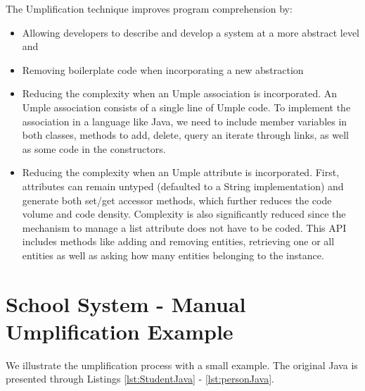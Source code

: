 The Umplification technique improves program comprehension by:
\begin{itemize}
\item Allowing developers to describe and develop a system at a more abstract level and

\item Removing boilerplate code when incorporating a new abstraction

\item Reducing the complexity when an Umple association is incorporated. An Umple association consists of a single line of Umple code. To implement the association in a language like Java, we need to include member variables in both classes, methods to add, delete, query an iterate through links, as well as some code in the constructors.

\item Reducing the complexity when an Umple attribute is incorporated. First, attributes can remain untyped (defaulted to a String implementation) and generate both set/get accessor methods, which further reduces the code volume and code density. Complexity is also significantly reduced since the mechanism to manage a list attribute does not have to be coded. This API includes methods like adding and removing entities, retrieving one or all entities as well as asking how many entities belonging to the instance.
\end{itemize}

\section{School System - Manual Umplification Example}
We illustrate the umplification process with a small example. The original Java is presented through Listings \ref{lst:StudentJava} - \ref{lst:personJava}.

